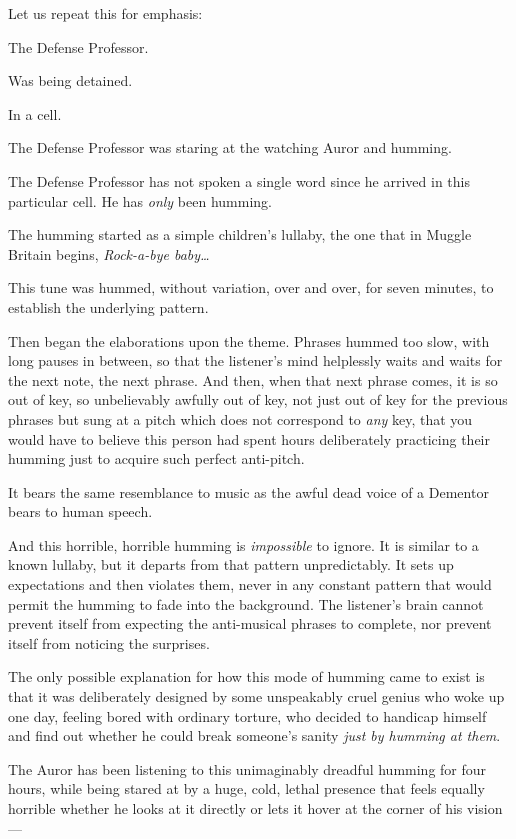 Let us repeat this for emphasis:

The Defense Professor.

Was being detained.

In a cell.

The Defense Professor was staring at the watching Auror and humming.

The Defense Professor has not spoken a single word since he arrived in this particular cell. He has \emph{only} been humming.

The humming started as a simple children's lullaby, the one that in Muggle Britain begins, \emph{Rock-a-bye baby{\ldots}}

This tune was hummed, without variation, over and over, for seven minutes, to establish the underlying pattern.

Then began the elaborations upon the theme. Phrases hummed too slow, with long pauses in between, so that the listener's mind helplessly waits and waits for the next note, the next phrase. And then, when that next phrase comes, it is so out of key, so unbelievably awfully out of key, not just out of key for the previous phrases but sung at a pitch which does not correspond to \emph{any} key, that you would have to believe this person had spent hours deliberately practicing their humming just to acquire such perfect anti-pitch.

It bears the same resemblance to music as the awful dead voice of a Dementor bears to human speech.

And this horrible, horrible humming is \emph{impossible} to ignore. It is similar to a known lullaby, but it departs from that pattern unpredictably. It sets up expectations and then violates them, never in any constant pattern that would permit the humming to fade into the background. The listener's brain cannot prevent itself from expecting the anti-musical phrases to complete, nor prevent itself from noticing the surprises.

The only possible explanation for how this mode of humming came to exist is that it was deliberately designed by some unspeakably cruel genius who woke up one day, feeling bored with ordinary torture, who decided to handicap himself and find out whether he could break someone's sanity \emph{just by humming at them}.

The Auror has been listening to this unimaginably dreadful humming for four hours, while being stared at by a huge, cold, lethal presence that feels equally horrible whether he looks at it directly or lets it hover at the corner of his vision—

